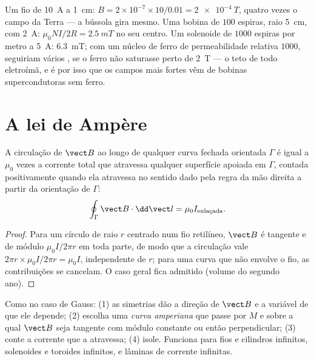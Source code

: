 \begin{example}\label{ex:b1:magnetostatics:orders}
Um fio de \qty{10}{A} a \qty{1}{cm}: $B = 2 \times 10^{-7} \times 10/0.01 =
\qty{2e-4}{T}$, quatro vezes o campo da Terra --- a bússola gira mesmo.
Uma bobina de $100$ espiras, raio \qty{5}{cm}, com \qty{2}{A}: $\mu_0NI/2R =
\qty{2.5}{mT}$ no seu centro. Um solenoide de $1000$ espiras por metro a
\qty{5}{A}: \qty{6.3}{mT}; com um núcleo de ferro de permeabilidade relativa
$1000$, seguiriam vários , se o ferro não saturasse perto de
\qty{2}{T} --- o teto de todo eletroímã, e é por isso que os
campos mais fortes vêm de bobinas supercondutoras sem ferro.
\end{example}

\section{A lei de Ampère}

\begin{theorem}[Ampère]\label{thm:b1:magnetostatics:ampere}
A circulação de $\vect B$ ao longo de qualquer curva fechada orientada $\Gamma$
é igual a $\mu_0$ vezes a corrente total que atravessa qualquer superfície apoiada em
$\Gamma$, contada positivamente quando ela atravessa no sentido dado pela
regra da mão direita a partir da orientação de $\Gamma$:
\[
\oint_\Gamma \vect B\cdot\dd\vect l = \mu_0 I_{\text{enlaçada}} .
\]
\end{theorem}

\begin{proof}
Para um círculo de raio $r$ centrado num fio retilíneo, $\vect B$ é
tangente e de módulo $\mu_0I/2\pi r$ em toda parte, de modo que a circulação vale
$2\pi r \times \mu_0I/2\pi r = \mu_0I$, independente de $r$; para uma curva que não
envolve o fio, as contribuições se cancelam. O caso geral fica
admitido (volume do segundo ano).
\end{proof}

\begin{method}\label{meth:b1:magnetostatics:ampere}
Como no caso de Gauss: (1) as simetrias dão a direção de $\vect B$ e a
variável de que ele depende; (2) escolha uma \emph{curva amperiana} que passe por $M$
e sobre a qual $\vect B$ seja tangente com módulo constante ou então
perpendicular; (3) conte a corrente que a atravessa; (4) isole. Funciona
para fios e cilindros infinitos, solenoides e toroides infinitos, e
lâminas de corrente infinitas.
\end{method}

